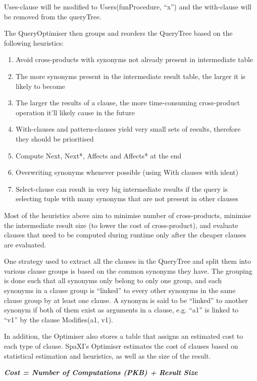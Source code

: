 \documentclass[12pt]{article}
\begin{document}
{{{{{{{{{{{{{\begin{center}
{\begin{minipage}{40em}
Uses-clause will be modified to Users(funProcedure, “x”) and the with-clause will be removed from the queryTree.

\end{minipage}}
\end{center}

The QueryOptimiser then groups and reorders the QueryTree based on the following heuristics:
\begin{enumerate}
\item Avoid cross-products with synonyms not already present in intermediate table
\item The more synonyms present in the intermediate result table, the larger it is likely to become
\item The larger the results of a clause, the more time-consuming cross-product operation it’ll likely cause in the future
\item With-clauses and pattern-clauses yield very small sets of results, therefore they should be prioritised
\item Compute Next, Next*, Affects and Affects* at the end
\item Overwriting synonyms whenever possible (using With clauses with ident)
\item Select-clause can result in very big intermediate results if the query is selecting tuple with many synonyms that are not present in other clauses
\end{enumerate}

Most of the heuristics above aim to minimise number of cross-products, minimise the intermediate result size (to lower the cost of cross-product), and evaluate clauses that need to be computed during runtime only after the cheaper clauses are evaluated.

One strategy used to extract all the clauses in the QueryTree and split them into various clause groups is based on the common synonyms they have. The grouping is done such that all synonyms only belong to only one group, and each synonyms in a clause group is “linked” to every other synonyms in the same clause group by at least one clause. A synonym is said to be “linked” to another synonym if both of them exist as arguments in a clause, e.g. “a1” is linked to “v1” by the clause Modifies(a1, v1).

In addition, the Optimiser also stores a table that assigns an estimated cost to each type of clause. SpaXI’s Optimiser estimates the cost of clauses based on statistical estimation and heuristics, as well as the size of the result. \newline
\begin{center}
\textbf{\textit{Cost = Number of Computations (PKB) + Result Size}}
\end{center}

}}}}}}}}}}}}}
\end{document}
